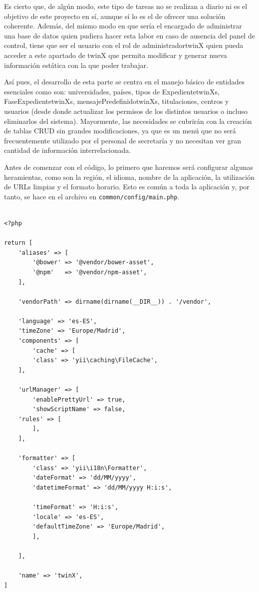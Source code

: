 Es cierto que, de algún modo, este tipo de tareas no se realizan a diario ni es el objetivo de este proyecto en sí, aunque sí lo es el de ofrecer una solución coherente. Además, del mismo modo en que sería el encargado de administrar una base de datos quien pudiera hacer esta labor en caso de ausencia del panel de control, tiene que ser el usuario con el rol de \gls{administradortwinX} quien pueda acceder a este apartado de twinX que permita modificar y generar nueva información estática con la que poder trabajar.

Así pues, el desarrollo de esta parte se centra en el manejo básico de entidades esenciales como son: universidades, países, tipos de \glspl{ExpedientetwinX}, \glspl{FaseExpedientetwinX}, \glspl{mensajePredefinidotwinX}, titulaciones, centros y usuarios (desde donde actualizar los permisos de los distintos usuarios o incluso eliminarlos del sistema). Mayormente, las necesidades se cubrirán con la creación de tablas CRUD sin grandes modificaciones, ya que es un menú que no será frecuentemente utilizado por el personal de secretaría y no necesitan ver gran cantidad de información interrelacionada.

Antes de comenzar con el código, lo primero que haremos será configurar algunas heramientas, como son la región, el idioma, nombre de la aplicación, la utilización de URLs limpias y el formato horario. Esto es común a toda la aplicación y, por tanto, se hace en el archivo en \texttt{common/config/main.php}.

\begin{verbatim}
	
<?php

return [
	'aliases' => [
		'@bower' => '@vendor/bower-asset',
		'@npm'   => '@vendor/npm-asset',
	],
	
	'vendorPath' => dirname(dirname(__DIR__)) . '/vendor',
	
	'language' => 'es-ES',
	'timeZone' => 'Europe/Madrid',
	'components' => [
		'cache' => [
		'class' => 'yii\caching\FileCache',
	],
	
	'urlManager' => [
		'enablePrettyUrl' => true,
		'showScriptName' => false,
	'rules' => [
		],
	],
	
	'formatter' => [
		'class' => 'yii\i18n\Formatter',
		'dateFormat' => 'dd/MM/yyyy',
		'datetimeFormat' => 'dd/MM/yyyy H:i:s',
		
		'timeFormat' => 'H:i:s',
		'locale' => 'es-ES',
		'defaultTimeZone' => 'Europe/Madrid',
		],
	
	],
	
	'name' => 'twinX',
]
	
\end{verbatim}

